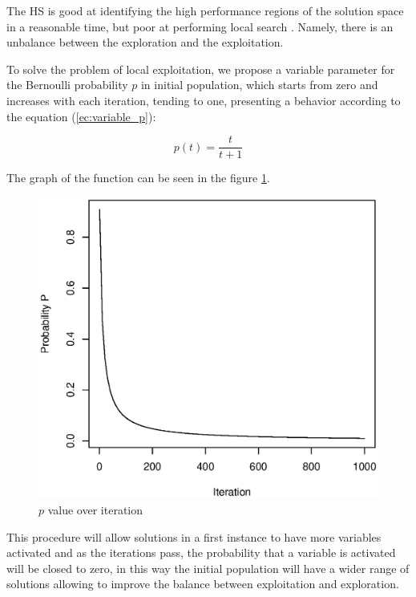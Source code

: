 The HS is good at identifying the high performance regions of the solution space in a reasonable time, but poor at performing local search \cite{DBLP:journals/eswa/XiangALHZ14}. Namely, there is an unbalance between the exploration and the exploitation. 
 
To solve the problem of local exploitation, we propose a variable parameter for the Bernoulli probability $p$ in initial population, which starts from zero and increases with each iteration, tending to one, presenting a behavior according to the equation (\ref{ec:variable_p}):

\begin{equation} \label{ec:variable_p} 
p(t) = \frac{t}{t+1}
\end{equation}	

The graph of the function can be seen in the figure \ref{fig:pvalue}.\\

\begin{figure}[H]
\centering
\includegraphics[scale=.35]{Implementacion/img/p_bernoulli.eps}
\caption{$p$ value over iteration}
\label{fig:pvalue}
\end{figure}

This procedure will allow solutions in a first instance to have more variables activated and as the iterations pass, the probability that a variable is activated will be closed to zero, in this way the initial population will have a wider range of solutions allowing to improve the balance between exploitation and exploration.

